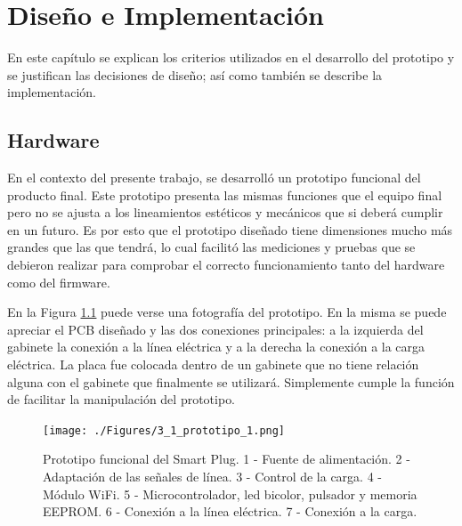 \chapter{Diseño e Implementación} %

\label{Chapter3} %


En este capítulo se explican los criterios utilizados en el desarrollo del prototipo y se justifican las decisiones de diseño; así como también se describe la implementación.

\section{Hardware}
\label{section:hardware}

En el contexto del presente trabajo, se desarrolló un prototipo funcional del producto final. Este prototipo presenta las mismas funciones que el equipo final pero no se ajusta a los lineamientos estéticos y mecánicos que si deberá cumplir en un futuro. Es por esto que el prototipo diseñado tiene dimensiones mucho más grandes que las que tendrá, lo cual facilitó las mediciones y pruebas que se debieron realizar para comprobar el correcto funcionamiento tanto del hardware como del firmware. 

En la Figura \ref{fig:prototipo} puede verse una fotografía del prototipo. En la misma se puede apreciar el PCB diseñado y las dos conexiones principales: a la izquierda del gabinete la conexión a la línea eléctrica y a la derecha la conexión a la carga eléctrica. La placa fue colocada dentro de un gabinete que no tiene relación alguna con el gabinete que finalmente se utilizará. Simplemente cumple la función de facilitar la manipulación del prototipo.

\begin{figure}[h]
	\centering
	\texttt{[image: ./Figures/3\_1\_prototipo\_1.png]}
	\caption{Prototipo funcional del Smart Plug. 1 - Fuente de alimentación. 2 - Adaptación de las señales de línea. 3 - Control de la carga. 4 - Módulo WiFi. 5 - Microcontrolador, led bicolor, pulsador y memoria EEPROM. 6 - Conexión a la línea eléctrica. 7 - Conexión a la carga.}
	\label{fig:prototipo}
\end{figure}

